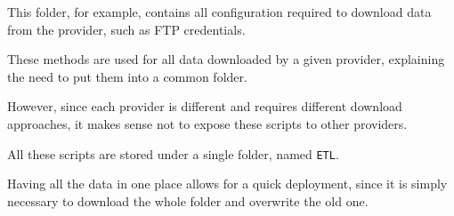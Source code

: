         This folder, for example, contains all configuration required to download data from the provider, such as FTP credentials.
        
        These methods are used for all data downloaded by a given provider, explaining the need to put them into a common folder.
        
        However, since each provider is different and requires different download approaches, it makes sense not to expose these scripts to other providers.

        All these scripts are stored under a single folder, named \texttt{ETL}.
        
        Having all the data in one place allows for a quick deployment, since it is simply necessary to download the whole folder and overwrite the old one.
        
        